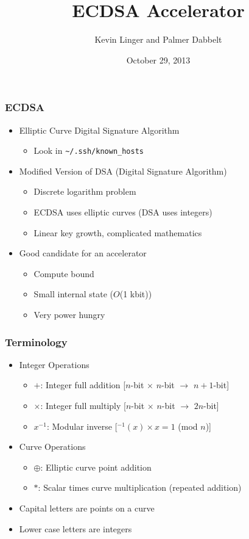 \documentclass{beamer}
\title{ECDSA Accelerator}
\author{Kevin Linger and Palmer Dabbelt}
\date{October 29, 2013}
\begin{document}
\maketitle

\begin{frame}
  \frametitle{ECDSA}

  \begin{itemize}
  \item Elliptic Curve Digital Signature Algorithm
    \begin{itemize}
    \item Look in \texttt{\textasciitilde/.ssh/known\_hosts}
    \end{itemize}
  \item Modified Version of DSA (Digital Signature Algorithm)
    \begin{itemize}
    \item Discrete logarithm problem
    \item ECDSA uses elliptic curves (DSA uses integers)
    \item Linear key growth, complicated mathematics
    \end{itemize}
  \item Good candidate for an accelerator
    \begin{itemize}
      \item Compute bound
      \item Small internal state ($O$(1 kbit))
      \item Very power hungry
    \end{itemize}
  \end{itemize}
\end{frame}

\begin{frame}
  \frametitle{Terminology}

  \begin{itemize}
  \item Integer Operations
    \begin{itemize}
    \item $+$: Integer full addition [$n$-bit $\times$ $n$-bit
      $\rightarrow$ $n+1$-bit]
    \item $\times$: Integer full multiply [$n$-bit $\times$ $n$-bit
      $\rightarrow$ $2n$-bit]
    \item $x^{-1}$: Modular inverse [$^{-1}(x) \times x = 1$ (mod $n$)]
    \end{itemize}
  \item Curve Operations
    \begin{itemize}
    \item $\oplus$: Elliptic curve point addition
    \item $*$: Scalar times curve multiplication (repeated addition)
    \end{itemize}
  \item Capital letters are points on a curve
  \item Lower case letters are integers
  \end{itemize}
\end{frame}
\end{document}
